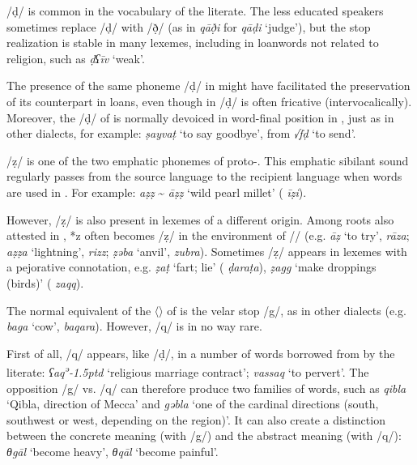 \documentclass[output=paper]{langsci/langscibook}
\begin{document}
/ḍ/ is common in the vocabulary of the literate. The less educated speakers sometimes replace /ḍ/ with /ð̣/ (as in \textit{qāð̣i} for \textit{qāḍi} ‘judge’), but the stop realization is stable in many lexemes, including in {loanwords} not related to religion, such as \textit{ḍʕīv} ‘weak’.

The presence of the same {phoneme} /ḍ/ in  might have facilitated the preservation of its counterpart in   loans, even though in  /ḍ/ is often fricative (intervocalically). Moreover, the /ḍ/ of  is normally devoiced in word-final position in , just as in other  dialects, for example: \textit{ṣayvaṭ} ‘to say goodbye’, from  \textit{√fḍ} ‘to send’.

/ẓ/ is one of the two {emphatic} phonemes of proto-. This {emphatic} {sibilant} sound regularly passes from the {source language} to the {recipient language} when  words are used in . For example: \textit{aẓẓ} \~{} \textit{āẓẓ} ‘wild pearl millet’ ( \textit{īẓi}).

However, /ẓ/ is also present in lexemes of a different origin. Among  {roots} also attested in  , *z often becomes /ẓ/ in the environment of /{\R}/ (e.g. \textit{{\R}āẓ} ‘to try’,  \textit{rāza}; \textit{{\R}aẓẓa} ‘lightning’,  \textit{rizz}; \textit{ẓəb{\R}a} ‘anvil’,  \textit{zubra}). Sometimes /ẓ/ appears in lexemes with a pejorative connotation, e.g. \textit{ẓ{\R}aṭ} ‘fart; lie’ ( \textit{ḍaraṭa}), \textit{ẓagg} ‘make droppings (birds)’ ( \textit{zaqq}).

The normal equivalent of the 〈{}〉 of   is the velar stop /g/, as in other  dialects (e.g. \textit{bag{\R}a} ‘cow’,  \textit{baqara}). However, /q/ is in no way rare.

First of all, /q/ appears, like /ḍ/, in a number of words borrowed from   by the literate: \textit{ʕaq\kern 0.5pt\textsuperscript{ə}\kern -1.5ptd} ‘religious marriage contract’; \textit{vassaq} ‘to pervert’. The opposition /g/ vs. /q/ can therefore produce two families of words, such as \textit{qibla} ‘Qibla, direction of {Mecca}’ and \textit{gəbla} ‘one of the cardinal directions (south, southwest or west, depending on the region)’. It can also create a distinction between the concrete meaning (with /g/) and the abstract meaning (with /q/): \textit{θgāl} ‘become heavy’, \textit{θqāl} ‘become painful’.
\end{document}
